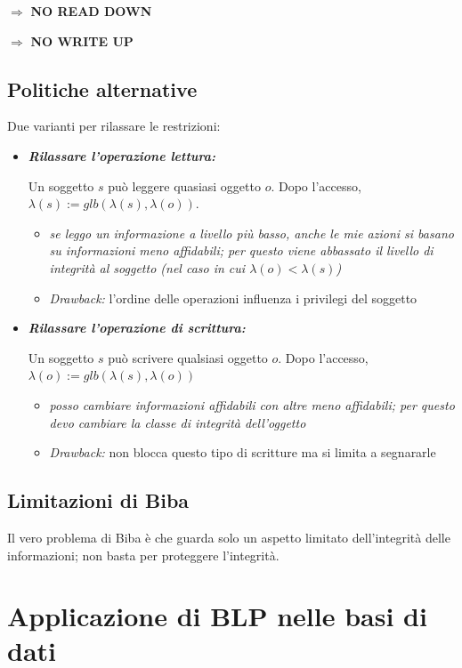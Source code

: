 \documentclass{report}
\begin{document}
$\Rightarrow$ \textbf{NO READ DOWN}

$\Rightarrow$ \textbf{NO WRITE UP}

\subsection{Politiche alternative}
Due varianti per rilassare le restrizioni:
\begin{itemize}
    \item \textbf{\textit{Rilassare l'operazione lettura:}}
    
    \noindent Un soggetto $s$ può leggere quasiasi oggetto $o$. Dopo l'accesso, 
    $\lambda(s):= glb(\lambda(s), \lambda(o))$.
    \begin{itemize}
        \item \textit{se leggo un informazione a livello più basso, anche le mie azioni 
        si basano su informazioni meno affidabili; per questo viene abbassato il livello di integrità
        al soggetto (nel caso in cui $\lambda(o) < \lambda(s)$)}
        \item \textit{Drawback:} l'ordine delle operazioni influenza i privilegi del soggetto
    \end{itemize}
    \item \textbf{\textit{Rilassare l'operazione di scrittura:}}

    \noindent Un soggetto $s$ può scrivere qualsiasi oggetto $o$. Dopo l'accesso, 
    $\lambda(o):= glb(\lambda(s), \lambda(o))$
    \begin{itemize}
        \item \textit{posso cambiare informazioni affidabili con altre meno affidabili; per questo 
        devo cambiare la classe di integrità dell'oggetto}
        \item \textit{Drawback:} non blocca questo tipo di scritture ma si limita a segnararle
    \end{itemize}
\end{itemize}

\subsection{Limitazioni di Biba}
Il vero problema di Biba è che guarda solo un aspetto limitato dell'integrità 
delle informazioni; non basta per proteggere l'integrità.

\newpage
\section{Applicazione di BLP nelle basi di dati}
\end{document}
